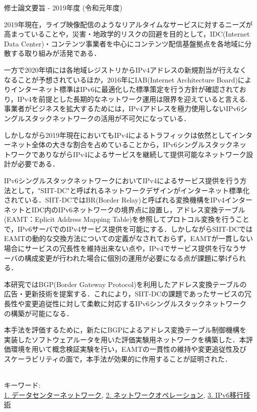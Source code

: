 修士論文要旨 - 2019年度 (令和元年度)
\begin{center}
\begin{large}
\end{large}
\end{center}

2019年現在，ライブ映像配信のようなリアルタイムなサービスに対するニーズが高まっていることや，災害・地政学的リスクの回避を目的として，IDC(Internet Data Center)・コンテンツ事業者を中心にコンテンツ配信基盤拠点を各地域に分散する取り組みが活発である．

一方で2020年頃には各地域レジストリからIPv4アドレスの新規割当が行えなくなることが予想されているほか，2016年にIAB(Internet Architecture Board)によりインターネット標準はIPv6に最適化した標準策定を行う方針が確認されており，IPv4を前提とした長期的なネットワーク運用は限界を迎えていると言える.事業者がビジネスを拡大するためには，IPv4アドレスを極力使用しないIPv6シングルスタックネットワークの活用が不可欠になっている．

しかしながら2019年現在においてもIPv4によるトラフィックは依然としてインターネット全体の大きな割合を占めていることから，IPv6シングルスタックネットワークでありながらIPv4によるサービスを継続して提供可能なネットワーク設計が必要である．

IPv6シングルスタックネットワークにおいてIPv4によるサービス提供を行う方法として，"SIIT-DC"と呼ばれるネットワークデザインがインターネット標準化されている．SIIT-DCではBR(Border Relay)と呼ばれる変換機構をIPv4インターネットとIDC内のIPv6ネットワークの境界点に設置し，アドレス変換テーブル(EAMT：Eplicit Address Mapping Table)を参照してプロトコル変換を行うことで，IPv6サーバでのIPv4サービス提供を可能にする．しかしながらSIIT-DCではEAMTの動的な交換方法についての定義がなされておらず，EAMTが一貫しない場合にサービスの冗長性を維持出来ない点や，IPv4でサービス提供を行なうサーバの構成変更が行われた場合に個別の運用が必要になる点が課題に挙げられる．

本研究ではBGP(Border Gateway Protocol)を利用したアドレス変換テーブルの広告・更新技術を提案する．これにより，SIIT-DCの課題であったサービスの冗長性や変更追従性に対して柔軟に対応するIPv6シングルスタックネットワークの構築が可能になる．

本手法を評価するために，新たにBGPによるアドレス変換テーブル制御機構を実装したソフトウェアルータを用いた評価実験用ネットワークを構築した．本評価環境を用いて概念検証実験を行い，EAMTの一貫性の維持や変更追従性及びスケーラビリティの面で，本手法が効果的に作用することが証明された．

~ \\

キーワード:\\
\underline{1. データセンターネットワーク},
\underline{2. ネットワークオペレーション},
\underline{3. IPv6移行技術}
\begin{flushright}
\dept \\
\author
\end{flushright}
